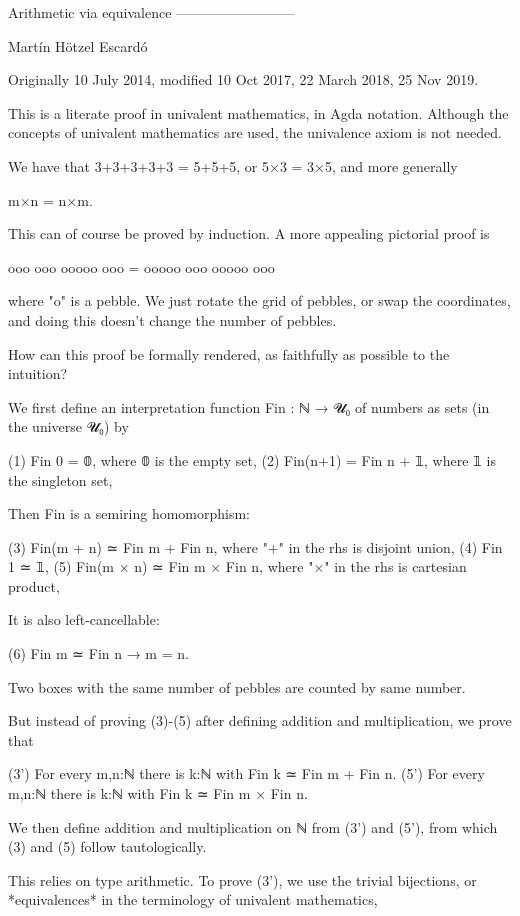 Arithmetic via equivalence
--------------------------

Martín Hötzel Escardó

Originally 10 July 2014, modified 10 Oct 2017, 22 March 2018, 25 Nov 2019.

This is a literate proof in univalent mathematics, in Agda
notation. Although the concepts of univalent mathematics are used, the
univalence axiom is not needed.

We have that 3+3+3+3+3 = 5+5+5, or 5×3 = 3×5, and more generally

  m×n = n×m.

This can of course be proved by induction. A more appealing pictorial
proof is

  ooo
  ooo         ooooo
  ooo    =    ooooo
  ooo         ooooo
  ooo

where "o" is a pebble. We just rotate the grid of pebbles, or swap
the coordinates, and doing this doesn't change the number of pebbles.

How can this proof be formally rendered, as faithfully as possible to
the intuition?

We first define an interpretation function Fin : ℕ → 𝓤₀ of numbers as
sets (in the universe 𝓤₀) by

 (1) Fin   0  = 𝟘,          where 𝟘 is the empty set,
 (2) Fin(n+1) = Fin n + 𝟙,  where 𝟙 is the singleton set,

Then Fin is a semiring homomorphism:

 (3) Fin(m + n) ≃ Fin m + Fin n, where "+" in the rhs is disjoint union,
 (4) Fin 1 ≃ 𝟙,
 (5) Fin(m × n) ≃ Fin m × Fin n, where "×" in the rhs is cartesian product,

It is also left-cancellable:

 (6) Fin m ≃ Fin n → m = n.

Two boxes with the same number of pebbles are counted by same number.

But instead of proving (3)-(5) after defining addition and
multiplication, we prove that

 (3') For every m,n:ℕ there is k:ℕ with Fin k ≃ Fin m + Fin n.
 (5') For every m,n:ℕ there is k:ℕ with Fin k ≃ Fin m × Fin n.

We then define addition and multiplication on ℕ from (3') and (5'),
from which (3) and (5) follow tautologically.

This relies on type arithmetic. To prove (3'), we use the trivial
bijections, or *equivalences* in the terminology of univalent
mathematics,

